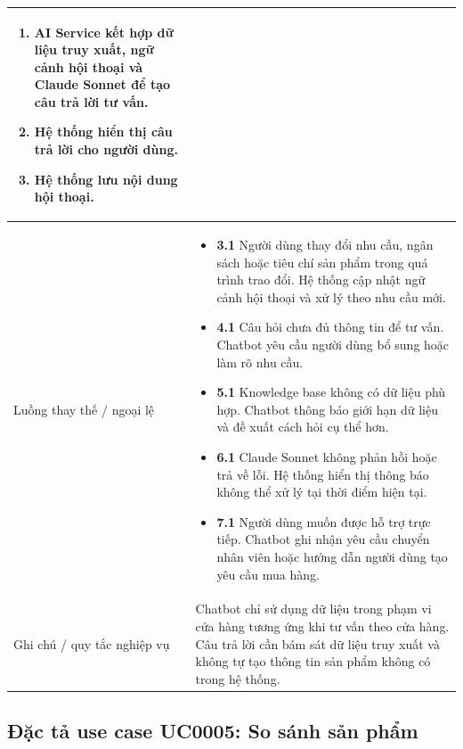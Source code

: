 \documentclass[../DoAn.tex]{subfiles}
\begin{document}
\begin{longtable}{|p{}|p{}|}
\begin{minipage}[t]{0.68\textwidth}
\begin{enumerate}
    \item AI Service kết hợp dữ liệu truy xuất, ngữ cảnh hội thoại và Claude Sonnet để tạo câu trả lời tư vấn.
    \item Hệ thống hiển thị câu trả lời cho người dùng.
    \item Hệ thống lưu nội dung hội thoại.
\end{enumerate}
\end{minipage}
\\
\hline
Luồng thay thế / ngoại lệ &
\begin{minipage}[t]{0.68\textwidth}
\begin{itemize}
    \item \textbf{3.1} Người dùng thay đổi nhu cầu, ngân sách hoặc tiêu chí sản phẩm trong quá trình trao đổi. Hệ thống cập nhật ngữ cảnh hội thoại và xử lý theo nhu cầu mới.
    \item \textbf{4.1} Câu hỏi chưa đủ thông tin để tư vấn. Chatbot yêu cầu người dùng bổ sung hoặc làm rõ nhu cầu.
    \item \textbf{5.1} Knowledge base không có dữ liệu phù hợp. Chatbot thông báo giới hạn dữ liệu và đề xuất cách hỏi cụ thể hơn.
    \item \textbf{6.1} Claude Sonnet không phản hồi hoặc trả về lỗi. Hệ thống hiển thị thông báo không thể xử lý tại thời điểm hiện tại.
    \item \textbf{7.1} Người dùng muốn được hỗ trợ trực tiếp. Chatbot ghi nhận yêu cầu chuyển nhân viên hoặc hướng dẫn người dùng tạo yêu cầu mua hàng.
\end{itemize}
\end{minipage}
\\
\hline
Ghi chú / quy tắc nghiệp vụ & Chatbot chỉ sử dụng dữ liệu trong phạm vi cửa hàng tương ứng khi tư vấn theo cửa hàng. Câu trả lời cần bám sát dữ liệu truy xuất và không tự tạo thông tin sản phẩm không có trong hệ thống. \\
\hline
\end{longtable}

\subsection{Đặc tả use case UC0005: So sánh sản phẩm}
\label{subsection:2.3.5}
\end{document}
